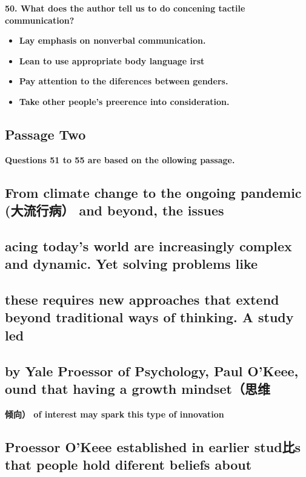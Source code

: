 \documentclass[UTF8,11pt]{ctexart}
\begin{document}
\textbf{50. What does the author tell us to do concening tactile communication?}


\begin{itemize}[leftmargin=2em,itemsep=.2em,topsep=.4em]\item[A.] \textbf{Lay emphasis on nonverbal communication.}
\item[B.] \textbf{Lean to use appropriate body language irst}
\item[C.] \textbf{Pay attention to the diferences between genders.}
\item[D.] \textbf{Take other people's preerence into consideration.}
\end{itemize}

\subsection*{\textbf{Passage Two}}


\textbf{Questions 51 to 55 are based on the ollowing passage.}


\subsection*{\textbf{From climate change to the ongoing pandemic (大流行病） and beyond, the issues}}


\subsection*{\textbf{acing today's world are increasingly complex and dynamic. Yet solving problems like}}


\subsection*{\textbf{these requires new approaches that extend beyond traditional ways of thinking. A study led}}


\subsection*{\textbf{by Yale Proessor of Psychology, Paul O'Keee, ound that having a growth mindset（思维}}


\textbf{倾向） of interest may spark this type of innovation}


\subsection*{\textbf{Proessor O'Keee established in earlier stud}比\textbf{s that people hold diferent beliefs about}}
\end{document}
